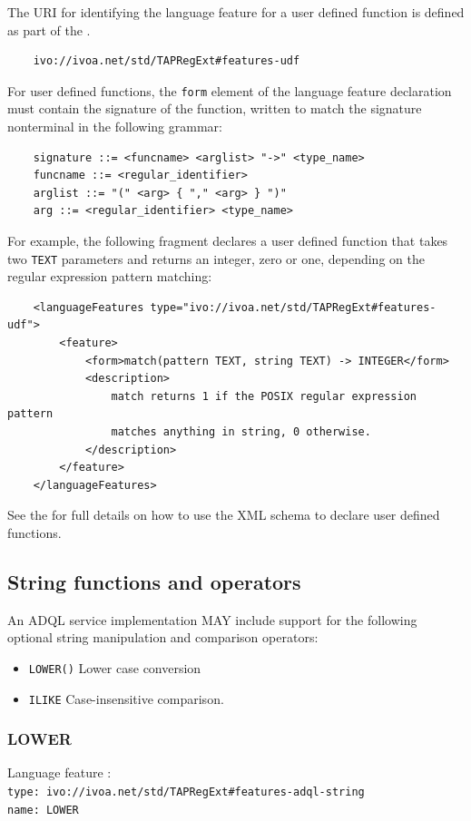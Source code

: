\documentclass[11pt,a4paper]{ivoa}
\begin{document}
The URI for identifying the language feature for a user defined function
is defined as part of the \TAPRegSpec.

\begin{verbatim}
    ivo://ivoa.net/std/TAPRegExt#features-udf
\end{verbatim}

For user defined functions, the \verb:form: element of the language feature
declaration must contain the signature of the function, written to match
the signature nonterminal in the following grammar:
\begin{verbatim}
    signature ::= <funcname> <arglist> "->" <type_name>
    funcname ::= <regular_identifier>
    arglist ::= "(" <arg> { "," <arg> } ")"
    arg ::= <regular_identifier> <type_name>
\end{verbatim}

For example, the following fragment declares a user defined function that
takes two \verb:TEXT: parameters and returns an integer, zero or one,
depending on the regular expression pattern matching:
\begin{verbatim}
    <languageFeatures type="ivo://ivoa.net/std/TAPRegExt#features-udf">
        <feature>
            <form>match(pattern TEXT, string TEXT) -> INTEGER</form>
            <description>
                match returns 1 if the POSIX regular expression pattern
                matches anything in string, 0 otherwise.
            </description>
        </feature>
    </languageFeatures>
\end{verbatim}

See the \TAPRegSpec for full details on how to use the
XML schema to declare user defined functions.

\subsection{String functions and operators}
\label{sec:string.functions}

An ADQL service implementation MAY include support for the following optional
string manipulation and comparison operators:

\begin{itemize}
    \item \verb:LOWER(): Lower case conversion
    \item \verb:ILIKE: Case-insensitive comparison.
\end{itemize}

\subsubsection{LOWER}
\label{sec:string.functions.lower}
{\footnotesize Language feature :}\\
{\footnotesize \verb|type: ivo://ivoa.net/std/TAPRegExt#features-adql-string|}\\
{\footnotesize \verb|name: LOWER|}\\
\end{document}
